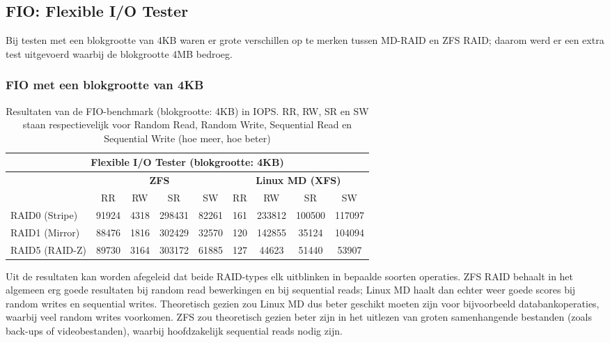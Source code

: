 \subsection{FIO: Flexible I/O Tester}

Bij testen met een blokgrootte van 4KB waren er grote verschillen op te merken tussen MD-RAID en ZFS RAID; daarom werd er een extra test uitgevoerd waarbij de blokgrootte 4MB bedroeg. 

\subsubsection{FIO met een blokgrootte van 4KB}

\begin{table}[h]
  \centering
  \begin{tabular}{l || c c c c | c c c c}
    \hline
    \multicolumn{9}{c}{\textbf{Flexible I/O Tester (blokgrootte: 4KB)}} \\
    \hline
    & \multicolumn{4}{c|}{\textbf{ZFS}} & \multicolumn{4}{|c}{\textbf{Linux MD (XFS)}} \\
    & RR & RW & SR & SW & RR & RW & SR & SW \\
    \hline
    RAID0 (Stripe) & 91924 & 4318 & 298431 & 82261 & 161 & 233812 & 100500  & 117097  \\
    RAID1 (Mirror) & 88476 & 1816 & 302429 & 32570 & 120 & 142855 & 35124  & 104094 \\
    RAID5 (RAID-Z) & 89730 & 3164 & 303172 & 61885 & 127 & 44623 & 51440  & 53907 \\
  \end{tabular}
  \caption{Resultaten van de FIO-benchmark (blokgrootte: 4KB) in IOPS. RR, RW, SR en SW staan respectievelijk voor Random Read, Random Write, Sequential Read en Sequential Write (hoe meer, hoe beter)}
  \label{tab:results_fio_4k}
\end{table}

Uit de resultaten kan worden afegeleid dat beide RAID-types elk uitblinken in bepaalde soorten operaties. ZFS RAID behaalt in het algemeen erg goede resultaten bij random read bewerkingen en bij sequential reads; Linux MD haalt dan echter weer goede scores bij random writes en sequential writes. Theoretisch gezien zou Linux MD dus beter geschikt moeten zijn voor bijvoorbeeld databankoperaties, waarbij veel random writes voorkomen. ZFS zou theoretisch gezien beter zijn in het uitlezen van groten samenhangende bestanden (zoals back-ups of videobestanden), waarbij hoofdzakelijk sequential reads nodig zijn.  

